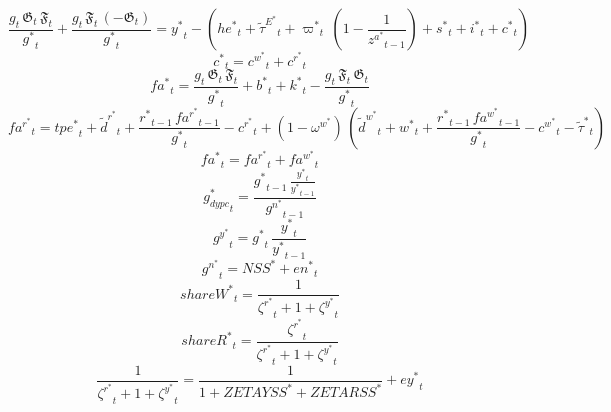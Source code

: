 \begin{dmath}
\frac{{{g}}_{t}\, {{\mathfrak{G}}}_{t}\, {{\mathfrak{F}}}_{t}}{{{g^*}}_{t}}+\frac{{{g}}_{t}\, {{\mathfrak{F}}}_{t}\, \left(-{{\mathfrak{G}}}_{t}\right)}{{{g^*}}_{t}}={{y^*}}_{t}-\left({{he^*}}_{t}+{\tilde{\tau}^E^*}_{t}+{{\varpi^*}}_{t}\, \left(1-\frac{1}{{{z^a^*}}_{t-1}}\right)+{{s^*}}_{t}+{{i^*}}_{t}+{{c^*}}_{t}\right)
\end{dmath}
\begin{dmath}
{{c^*}}_{t}={{c^w^*}}_{t}+{{c^r^*}}_{t}
\end{dmath}
\begin{dmath}
{{fa^*}}_{t}=\frac{{{g}}_{t}\, {{\mathfrak{G}}}_{t}\, {{\mathfrak{F}}}_{t}}{{{g^*}}_{t}}+{{b^*}}_{t}+{{k^*}}_{t}-\frac{{{g}}_{t}\, {{\mathfrak{F}}}_{t}\, {{\mathfrak{G}}}_{t}}{{{g^*}}_{t}}
\end{dmath}
\begin{dmath}
{{fa^r^*}}_{t}={{tpe^*}}_{t}+{\tilde{d}^r^*}_{t}+\frac{{{r^*}}_{t-1}\, {{fa^r^*}}_{t-1}}{{{g^*}}_{t}}-{{c^r^*}}_{t}+\left(1-{{\omega^w^*}}\right)\, \left({\tilde{d}^w^*}_{t}+{{w^*}}_{t}+\frac{{{r^*}}_{t-1}\, {{fa^w^*}}_{t-1}}{{{g^*}}_{t}}-{{c^w^*}}_{t}-{\tilde{\tau}^*}_{t}\right)
\end{dmath}
\begin{dmath}
{{fa^*}}_{t}={{fa^r^*}}_{t}+{{fa^w^*}}_{t}
\end{dmath}
\begin{dmath}
{{g_{dypc}^*}}_{t}=\frac{{{g^*}}_{t-1}\, \frac{{{y^*}}_{t}}{{{y^*}}_{t-1}}}{{{g^n^*}}_{t-1}}
\end{dmath}
\begin{dmath}
{{g^y^*}}_{t}={{g^*}}_{t}\, \frac{{{y^*}}_{t}}{{{y^*}}_{t-1}}
\end{dmath}
\begin{dmath}
{{g^n^*}}_{t}={{NSS^*}}+{{en^*}}_{t}
\end{dmath}
\begin{dmath}
{{shareW^*}}_{t}=\frac{1}{{{\zeta^r^*}}_{t}+1+{{\zeta^y^*}}_{t}}
\end{dmath}
\begin{dmath}
{{shareR^*}}_{t}=\frac{{{\zeta^r^*}}_{t}}{{{\zeta^r^*}}_{t}+1+{{\zeta^y^*}}_{t}}
\end{dmath}
\begin{dmath}
\frac{1}{{{\zeta^r^*}}_{t}+1+{{\zeta^y^*}}_{t}}=\frac{1}{1+{{ZETAYSS^*}}+{{ZETARSS^*}}}+{{ey^*}}_{t}
\end{dmath}
